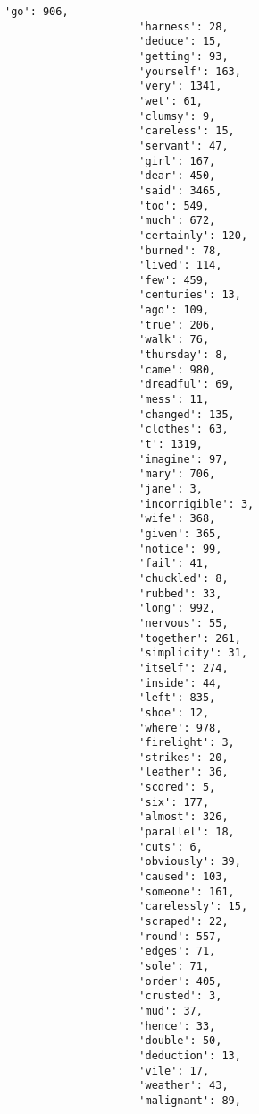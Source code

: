 \documentclass[11pt]{article}
\begin{document}
\begin{Verbatim}[commandchars=\\\{\}]
                     'go': 906,
                     'harness': 28,
                     'deduce': 15,
                     'getting': 93,
                     'yourself': 163,
                     'very': 1341,
                     'wet': 61,
                     'clumsy': 9,
                     'careless': 15,
                     'servant': 47,
                     'girl': 167,
                     'dear': 450,
                     'said': 3465,
                     'too': 549,
                     'much': 672,
                     'certainly': 120,
                     'burned': 78,
                     'lived': 114,
                     'few': 459,
                     'centuries': 13,
                     'ago': 109,
                     'true': 206,
                     'walk': 76,
                     'thursday': 8,
                     'came': 980,
                     'dreadful': 69,
                     'mess': 11,
                     'changed': 135,
                     'clothes': 63,
                     't': 1319,
                     'imagine': 97,
                     'mary': 706,
                     'jane': 3,
                     'incorrigible': 3,
                     'wife': 368,
                     'given': 365,
                     'notice': 99,
                     'fail': 41,
                     'chuckled': 8,
                     'rubbed': 33,
                     'long': 992,
                     'nervous': 55,
                     'together': 261,
                     'simplicity': 31,
                     'itself': 274,
                     'inside': 44,
                     'left': 835,
                     'shoe': 12,
                     'where': 978,
                     'firelight': 3,
                     'strikes': 20,
                     'leather': 36,
                     'scored': 5,
                     'six': 177,
                     'almost': 326,
                     'parallel': 18,
                     'cuts': 6,
                     'obviously': 39,
                     'caused': 103,
                     'someone': 161,
                     'carelessly': 15,
                     'scraped': 22,
                     'round': 557,
                     'edges': 71,
                     'sole': 71,
                     'order': 405,
                     'crusted': 3,
                     'mud': 37,
                     'hence': 33,
                     'double': 50,
                     'deduction': 13,
                     'vile': 17,
                     'weather': 43,
                     'malignant': 89,

\end{Verbatim}
\end{document}
